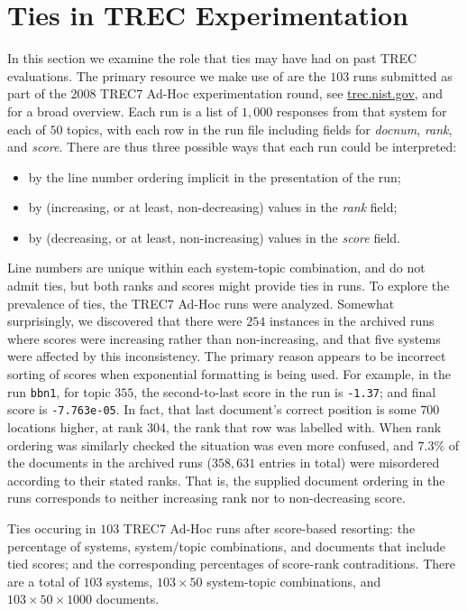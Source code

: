 \section{Ties in TREC Experimentation}
\label{sec-trecimpact}


In this section we examine the role that ties may have had on past
TREC evaluations.
The primary resource we make use of are the $103$ runs submitted as
part of the 2008 TREC7 Ad-Hoc experimentation round, see
{\small\url{trec.nist.gov}}, and {\citet{harman05trecbook}} for a
broad overview.
Each run is a list of $1{,}000$ responses from that system for each
of $50$ topics, with each row in the run file including fields for
{\emph{docnum}}, {\emph{rank}}, and {\emph{score}}.
There are thus three possible ways that each run could be
interpreted:
\begin{itemize}
\item
by the line number ordering implicit in the presentation of the run;
\item
by (increasing, or at least, non-decreasing) values in the
{\emph{rank}} field;
\item
by (decreasing, or at least, non-increasing) values in the
{\emph{score}} field.
\end{itemize}
Line numbers are unique within each system-topic combination, and do
not admit ties, but both ranks and scores might provide ties in runs.
To explore the prevalence of ties, the TREC7 Ad-Hoc runs were
analyzed.
Somewhat surprisingly, we discovered that there were $254$ instances
in the archived runs where scores were increasing rather than
non-increasing, and that five systems were affected by this
inconsistency.
The primary reason appears to be incorrect sorting of scores when
exponential formatting is being used.
For example, in the run {\tt{bbn1}}, for topic $355$, the
second-to-last score in the run is {\tt{-1.37}}; and final score is
{\tt{-7.763e-05}}.
In fact, that last document's correct position is some $700$
locations higher, at rank $304$, the rank that row was labelled with.
When rank ordering was similarly checked the situation was even more
confused, and $7.3$\% of the documents in the archived runs
($358{,}631$ entries in total) were misordered according to their
stated ranks.
That is, the supplied document ordering in the runs corresponds to
neither increasing rank nor to non-decreasing score.

\begin{table}[t!]
\centering

\renewcommand{\tabcolsep}{0.5em}
\caption{Ties occuring in $103$ TREC7 Ad-Hoc runs after score-based
resorting: the percentage of systems, system/topic combinations, and
documents that include tied scores; and the corresponding percentages 
of score-rank contraditions.
There are a total of $103$ systems, $103\times50$ system-topic combinations,
and $103\times50\times1000$ documents.
\label{tbl-trec7-ties}}
\end{table}

